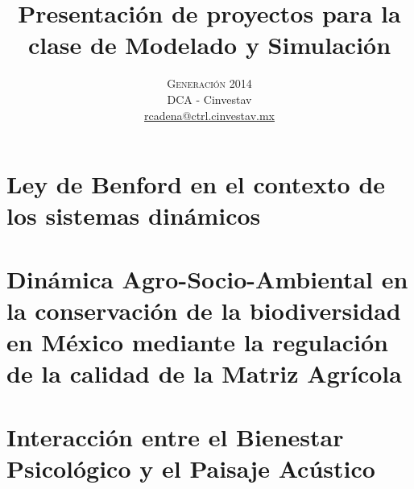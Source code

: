 



\title{\vspace{-15mm}\fontsize{24pt}{10pt}\selectfont\textbf{Presentación de proyectos para la clase de Modelado y Simulación}} %

\author{
\large \textsc{Generación 2014}\\[2mm] %
\normalsize DCA - Cinvestav \\ %
\normalsize \href{mailto:rcadena@ctrl.cinvestav.mx}{rcadena@ctrl.cinvestav.mx} %
\vspace{-5mm}
}
\date{}




    \maketitle %
    \thispagestyle{fancy} %


    \chapter{Ley de Benford en el contexto de los sistemas dinámicos}
    

    \chapter{Dinámica Agro-Socio-Ambiental en la conservación de la biodiversidad en México mediante la regulación de la calidad de la Matriz Agrícola}
    

    \chapter{Interacción entre el Bienestar Psicológico y el Paisaje Acústico}





